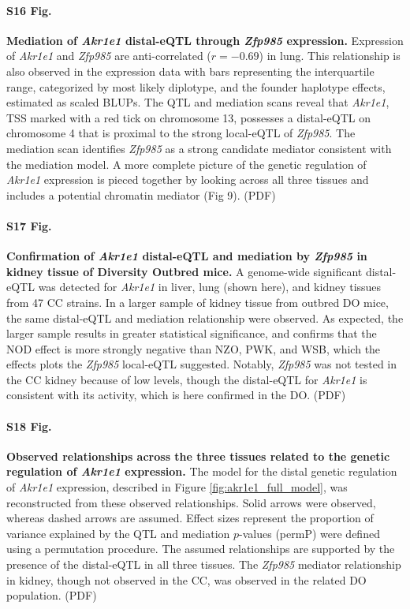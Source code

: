 \documentclass[10pt,letterpaper]{article}
\begin{document}
\paragraph*{S16 Fig.}
\label{S_akr1e1_exmediation}
{\bf Mediation of \textit{Akr1e1} distal-eQTL through \textit{Zfp985} expression.}
Expression of \textit{Akr1e1} and \textit{Zfp985} are anti-correlated ($r = -0.69$) in lung. This relationship is also observed in the expression data with bars representing the interquartile range, categorized by most likely diplotype, and the founder haplotype effects, estimated as scaled BLUPs. The QTL and mediation scans reveal that \textit{Akr1e1}, TSS marked with a red tick on chromosome 13, possesses a distal-eQTL on chromosome 4 that is proximal to the strong local-eQTL of \textit{Zfp985}. The mediation scan identifies \textit{Zfp985} as a strong candidate mediator consistent with the mediation model. A more complete picture of the genetic regulation of \textit{Akr1e1} expression is pieced together by looking across all three tissues and includes a potential chromatin mediator (Fig 9). (PDF)

\paragraph*{S17 Fig.}
\label{S_do_akr1e1}
{\bf Confirmation of \textit{Akr1e1} distal-eQTL and mediation by \textit{Zfp985} in kidney tissue of Diversity Outbred mice.}
A genome-wide significant distal-eQTL was detected for \textit{Akr1e1} in liver, lung (shown here), and kidney tissues from 47 CC strains. In a larger sample of kidney tissue from outbred DO mice, the same distal-eQTL and mediation relationship were observed. As expected, the larger sample results in greater statistical significance, and confirms that the NOD effect is more strongly negative than NZO, PWK, and WSB, which the effects plots the \textit{Zfp985} local-eQTL suggested. Notably, \textit{Zfp985} was not tested in the CC kidney because of low levels, though the distal-eQTL for \textit{Akr1e1} is consistent with its activity, which is here confirmed in the DO. (PDF)

\paragraph*{S18 Fig.}
\label{S_akr1e1_relationships}
{\bf Observed relationships across the three tissues related to the genetic regulation of \textit{Akr1e1} expression.}
The model for the distal genetic regulation of \textit{Akr1e1} expression, described in Figure \ref{fig:akr1e1_full_model}, was reconstructed from these observed relationships. Solid arrows were observed, whereas dashed arrows are assumed. Effect sizes represent the proportion of variance explained by the QTL and mediation $p$-values (permP) were defined using a permutation procedure. The assumed relationships are supported by the presence of the distal-eQTL in all three tissues. The \textit{Zfp985} mediator relationship in kidney, though not observed in the CC, was observed in the related DO population. (PDF)
\end{document}
